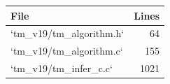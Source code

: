 \begin{tabular}{lr}
\toprule
File & Lines \\
\midrule
`tm\_v19/tm\_algorithm.h` & 64 \\
`tm\_v19/tm\_algorithm.c` & 155 \\
`tm\_v19/tm\_infer\_c.c` & 1021 \\
\bottomrule
\end{tabular}
